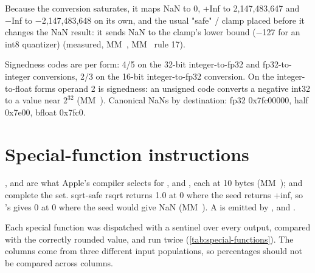 Because the conversion saturates, it maps NaN to 0, +Inf to 2,147,483,647 and −Inf to −2,147,483,648 on its own, and the
usual "safe" / clamp placed before it changes the NaN result: it sends NaN to the clamp's lower bound (−127 for an
int8 quantizer) (measured, MM~, MM~ rule 17).

Signedness codes are per form: 4/5 on the 32-bit integer-to-fp32 and fp32-to-integer conversions, 2/3 on the 16-bit
integer-to-fp32 conversion. On the integer-to-float forms operand 2 is signedness: an unsigned code converts a negative
int32 to a value near $2^{32}$ (MM~). Canonical NaNs by destination: fp32 0x7fc00000, half 0x7e00, bfloat 0x7fc0.

\section{Special-function instructions}\label{sec:special-function-instructions}

,  and  are what Apple's compiler selects for ,
 and , each at 10 bytes (MM~);  and  complete the
set. sqrt-safe rsqrt returns 1.0 at 0 where the seed returns +inf, so 's  gives 0 at 0 where the
seed would give NaN (MM~). A  is emitted by ,  and .

Each special function was dispatched with a sentinel over every output, compared with the correctly
rounded value, and run twice (\cref{tab:special-functions}). The columns come from three different input populations, so percentages should not be
compared across columns.

